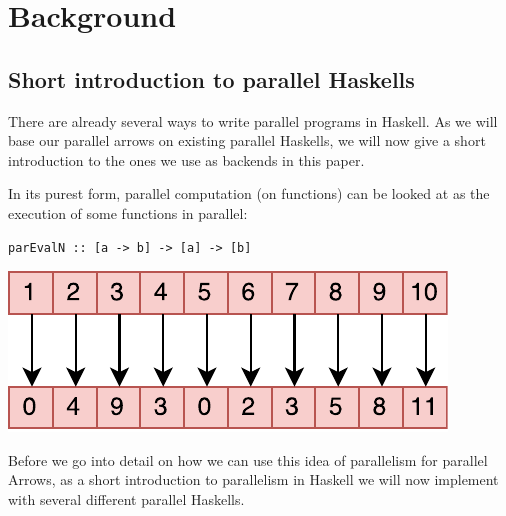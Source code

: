 \section{Background}
\label{sec:background}
\subsection{Short introduction to parallel Haskells}
There are already several ways to write parallel programs in Haskell. As we will base our parallel arrows on existing parallel Haskells, we will now give a short introduction to the ones we use as backends in this paper.

In its purest form, parallel computation (on functions) can be looked at as the execution of some functions  in parallel:

\begin{lstlisting}[frame=htrbl]
parEvalN :: [a -> b] -> [a] -> [b]
\end{lstlisting}
\begin{center}
	\includegraphics[scale=0.7]{images/parEvalN}
\end{center}
Before we go into detail on how we can use this idea of parallelism for parallel Arrows, as a short introduction to parallelism in Haskell we will now implement  with several different parallel Haskells.


